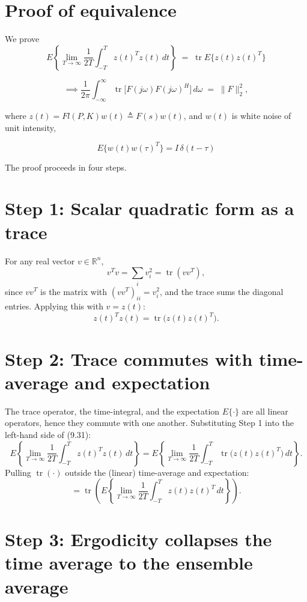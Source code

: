 \section{Proof of equivalence}
We prove
\begin{equation}
    E\left\{\lim_{T\to\infty}\frac{1}{2T}\int_{-T}^{T} z(t)^Tz(t)\,dt\right\}
    \;=\;
    \operatorname{tr}E\{z(t)z(t)^T\}
\end{equation}

\begin{equation}
    \implies
    \frac{1}{2\pi}\int_{-\infty}^{\infty}\operatorname{tr}\big[F(j\omega)F(j\omega)^H\big]\,d\omega
    \;=\;
    \|F\|_2^2,
\end{equation}

where $z(t) = Fl(P,K)w(t) \triangleq F(s)w(t)$, and $w(t)$ is white noise of unit intensity,

\[
    E\{w(t)w(\tau)^T\} = I\,\delta(t-\tau)
\]

\bigskip
\noindent The proof proceeds in four steps.

\section*{Step 1: Scalar quadratic form as a trace}

For any real vector $v \in \mathbb{R}^n$,
\[
    v^Tv = \sum_i v_i^2 = \operatorname{tr}(vv^T),
\]
since $vv^T$ is the matrix with $(vv^T)_{ii} = v_i^2$, and the trace sums the diagonal entries. Applying this with $v = z(t)$:
\[
    z(t)^Tz(t) = \operatorname{tr}\big(z(t)z(t)^T\big).
\]

\section*{Step 2: Trace commutes with time-average and expectation}

The trace operator, the time-integral, and the expectation $E\{\cdot\}$ are all linear operators, hence they commute with one another. Substituting Step 1 into the left-hand side of (9.31):
\[
    E\left\{\lim_{T\to\infty}\frac{1}{2T}\int_{-T}^{T} z(t)^Tz(t)\,dt\right\}
    = E\left\{\lim_{T\to\infty}\frac{1}{2T}\int_{-T}^{T} \operatorname{tr}\big(z(t)z(t)^T\big)\,dt\right\}.
\]
Pulling $\operatorname{tr}(\cdot)$ outside the (linear) time-average and expectation:
\[
    = \operatorname{tr}\left(E\left\{\lim_{T\to\infty}\frac{1}{2T}\int_{-T}^{T} z(t)z(t)^T\,dt\right\}\right).
\]

\section*{Step 3: Ergodicity collapses the time average to the ensemble average}

